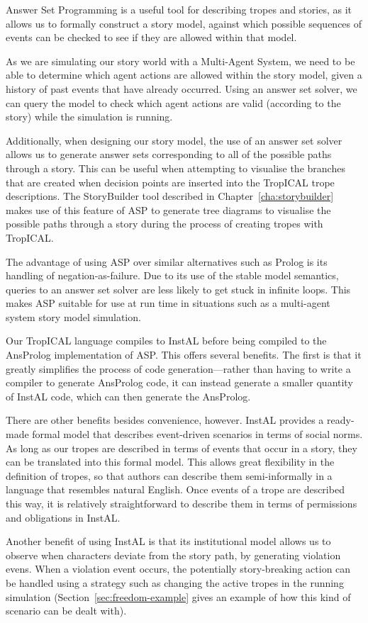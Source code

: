 \documentclass[11pt]{report}
\newcommand{\added}[2]{%
  \todo[noline,bordercolor=white,color=green,size=\scriptsize]{#2}
  \cbcolor{green}
  \begin{changebar}
    #1
  \end{changebar}%
  }%
\newcommand{\added}[2]{#1}
\begin{document}
\added{
Answer Set Programming is a useful tool for describing tropes and stories, as it
allows us to formally construct a story model, against which possible sequences
of events can be checked to see if they are allowed within that model.

As we are simulating our story world with a Multi-Agent System, we need to be
able to determine which agent actions are allowed within the story model, given
a history of past events that have already occurred. Using an answer set solver,
we can query the model to check which agent actions are valid (according to the
story) while the simulation is running.

Additionally, when designing our story model, the use of an answer set solver
allows us to generate answer sets corresponding to all of the possible paths
through a story. This can be useful when attempting to visualise the branches
that are created when decision points are inserted into the TropICAL trope
descriptions. The StoryBuilder tool described in Chapter~\ref{cha:storybuilder}
makes use of this feature of ASP to generate tree diagrams to visualise the
possible paths through a story during the process of creating tropes with TropICAL.

The advantage of using ASP over similar alternatives such as Prolog is its
handling of negation-as-failure. Due to its use of the stable model semantics,
queries to an answer set solver are less likely to get stuck in infinite loops.
This makes ASP suitable for use at run time in situations such as a multi-agent
system story model simulation.

Our TropICAL language compiles to InstAL before being compiled to the AnsProlog
implementation of ASP. This offers several benefits. The first is that it
greatly simplifies the process of code generation---rather than having to write
a compiler to generate AnsProlog code, it can instead generate a smaller
quantity of InstAL code, which can then generate the AnsProlog.

There are other benefits besides convenience, however. InstAL provides a
ready-made formal model that describes event-driven scenarios in terms of social
norms. As long as our tropes are described in terms of events that occur in a
story, they can be translated into this formal model. This allows great
flexibility in the definition of tropes, so that authors can describe them
semi-informally in a language that resembles natural English. Once events of a
trope are described this way, it is relatively straightforward to describe them
in terms of permissions and obligations in InstAL.

Another benefit of using InstAL is that its institutional model allows us to
observe when characters deviate from the story path, by generating violation
evens. When a violation event occurs, the potentially story-breaking action can
be handled using a strategy such as changing the active tropes in the running
simulation (Section~\ref{sec:freedom-example} gives an example of how this kind
of scenario can be dealt with).
}{2.4.2: Explanation of why ASP and InstAL were chosen}
\end{document}
